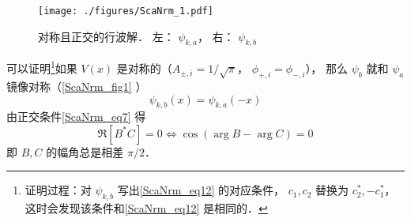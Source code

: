 \begin{figure}[ht]
\centering
\texttt{[image: ./figures/ScaNrm\_1.pdf]}
\caption{对称且正交的行波解． 左： $\psi_{k,a}$， 右： $\psi_{k,b}$} \label{ScaNrm_fig1}
\end{figure}

可以证明\footnote{证明过程：对 $\psi_{k,b}$ 写出\autoref{ScaNrm_eq12} 的对应条件， $c_1,c_2$ 替换为 $c_2^*, -c_1^*$， 这时会发现该条件和\autoref{ScaNrm_eq12} 是相同的．}如果 $V(x)$ 是对称的（$A_{\pm,i} = 1/\sqrt{\pi}$， $\phi_{+,i}=\phi_{-,i}$）， 那么 $\psi_b$ 就和 $\psi_a$ 镜像对称（\autoref{ScaNrm_fig1} ）
\begin{equation}
\psi_{k,b}(x) = \psi_{k,a}(-x)
\end{equation}
由正交条件\autoref{ScaNrm_eq7} 得
\begin{equation}\label{ScaNrm_eq11}
\Re[B^*C] = 0 \Longleftrightarrow \cos(\arg{B} - \arg{C}) = 0
\end{equation}
即 $B,C$ 的幅角总是相差 $\pi/2$．
